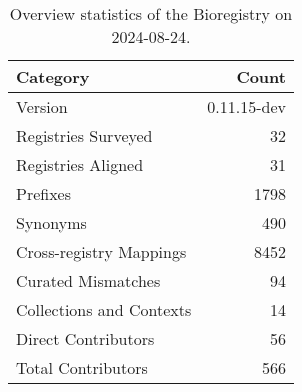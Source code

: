 \begin{table}
\caption{Overview statistics of the Bioregistry on 2024-08-24.}
\label{tab:bioregistry-summary}
\begin{tabular}{lr}
\toprule
Category & Count \\
\midrule
Version & 0.11.15-dev \\
Registries Surveyed & 32 \\
Registries Aligned & 31 \\
Prefixes & 1798 \\
Synonyms & 490 \\
Cross-registry Mappings & 8452 \\
Curated Mismatches & 94 \\
Collections and Contexts & 14 \\
Direct Contributors & 56 \\
Total Contributors & 566 \\
\bottomrule
\end{tabular}
\end{table}
